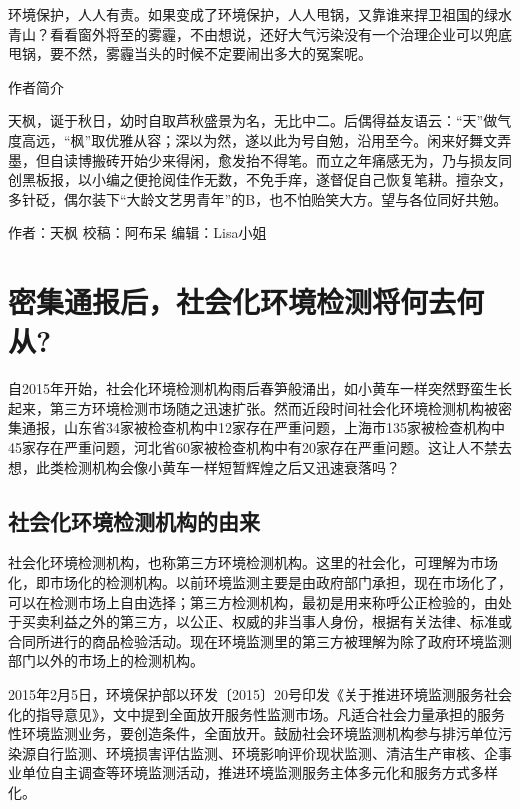\documentclass[]{book}
\begin{document}
环境保护，人人有责。如果变成了环境保护，人人甩锅，又靠谁来捍卫祖国的绿水青山？看看窗外将至的雾霾，不由想说，还好大气污染没有一个治理企业可以兜底甩锅，要不然，雾霾当头的时候不定要闹出多大的冤案呢。

作者简介

天枫，诞于秋日，幼时自取芦秋盛景为名，无比中二。后偶得益友语云：``天''做气度高远，``枫''取优雅从容；深以为然，遂以此为号自勉，沿用至今。闲来好舞文弄墨，但自读博搬砖开始少来得闲，愈发抬不得笔。而立之年痛感无为，乃与损友同创黑板报，以小编之便抢阅佳作无数，不免手痒，遂督促自己恢复笔耕。擅杂文，多针砭，偶尔装下``大龄文艺男青年''的B，也不怕贻笑大方。望与各位同好共勉。

作者：天枫
校稿：阿布呆
编辑：Lisa小姐

\hypertarget{ux5bc6ux96c6ux901aux62a5ux540eux793eux4f1aux5316ux73afux5883ux68c0ux6d4bux5c06ux4f55ux53bbux4f55ux4ece}{%
\section{密集通报后，社会化环境检测将何去何从?}\label{ux5bc6ux96c6ux901aux62a5ux540eux793eux4f1aux5316ux73afux5883ux68c0ux6d4bux5c06ux4f55ux53bbux4f55ux4ece}}

自2015年开始，社会化环境检测机构雨后春笋般涌出，如小黄车一样突然野蛮生长起来，第三方环境检测市场随之迅速扩张。然而近段时间社会化环境检测机构被密集通报，山东省34家被检查机构中12家存在严重问题，上海市135家被检查机构中45家存在严重问题，河北省60家被检查机构中有20家存在严重问题。这让人不禁去想，此类检测机构会像小黄车一样短暂辉煌之后又迅速衰落吗？

\hypertarget{ux793eux4f1aux5316ux73afux5883ux68c0ux6d4bux673aux6784ux7684ux7531ux6765}{%
\subsection{社会化环境检测机构的由来}\label{ux793eux4f1aux5316ux73afux5883ux68c0ux6d4bux673aux6784ux7684ux7531ux6765}}

社会化环境检测机构，也称第三方环境检测机构。这里的社会化，可理解为市场化，即市场化的检测机构。以前环境监测主要是由政府部门承担，现在市场化了，可以在检测市场上自由选择；第三方检测机构，最初是用来称呼公正检验的，由处于买卖利益之外的第三方，以公正、权威的非当事人身份，根据有关法律、标准或合同所进行的商品检验活动。现在环境监测里的第三方被理解为除了政府环境监测部门以外的市场上的检测机构。

2015年2月5日，环境保护部以环发〔2015〕20号印发《关于推进环境监测服务社会化的指导意见》，文中提到全面放开服务性监测市场。凡适合社会力量承担的服务性环境监测业务，要创造条件，全面放开。鼓励社会环境监测机构参与排污单位污染源自行监测、环境损害评估监测、环境影响评价现状监测、清洁生产审核、企事业单位自主调查等环境监测活动，推进环境监测服务主体多元化和服务方式多样化。
\end{document}
